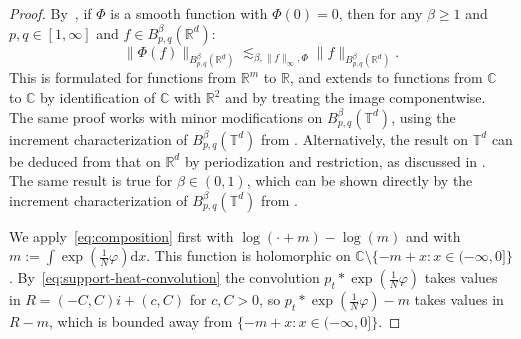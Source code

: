 \documentclass[a4paper,12pt]{article}
\newcommand{\mathd}{\mathrm{d}}
\newcommand{\R}{\mathbb{R}}
\newcommand{\T}{\mathbb{T}}
\newcommand{\C}{\mathbb{C}}
\begin{document}
\begin{proof}
    By~\cite[Chapter 5.5, Theorem~2]{Runst1996}, if $\Phi$ is a smooth function with $\Phi(0) = 0$, then for any $\beta \geq 1$ and $p,q \in [1,\infty]$ and $f \in B^\beta_{p,q}(\R^d)$:
    \begin{equation}\label{eq:composition}
        \|\Phi(f)\|_{B^\beta_{p,q}(\R^d)} \lesssim_{\beta,\|f\|_\infty,\Phi} \|f\|_{B^\beta_{p,q}(\R^d)}.
    \end{equation}
    This is formulated for functions from $\R^m$ to $\R$, and extends to functions from $\C$ to $\C$ by identification of $\C$ with $\R^2$ and by treating the image componentwise. The same proof works with minor modifications on $B^\beta_{p,q}(\T^d)$, using the increment characterization of $B^\beta_{p,q}(\T^d)$ from \cite[Chapter 3.5.4]{Schmeisser1987}. Alternatively, the result on $\T^d$ can be deduced from that on $\R^d$ by periodization and restriction, as discussed in \cite[Section 5]{Ehrnstrom2018}. The same result is true for $\beta \in (0,1)$, which can be shown directly by the increment characterization of $B^\beta_{p,q}(\T^d)$ from \cite[Chapter 3.5.4]{Schmeisser1987}.
    
    We apply~\eqref{eq:composition} first with $\log(\cdot + m) - \log( m)$ %
    and with $m:=\int \exp(\tfrac1N \varphi) \mathd x$. This function is holomorphic on $\C\setminus\{-m+x: x \in (-\infty, 0]\}$.  By~\eqref{eq:support-heat-convolution} the convolution $p_t \ast \exp(\tfrac1N \varphi)$ takes values  in $R =  (- C, C) i + (c, C)$ for $c,C>0$, so $p_t \ast \exp(\tfrac1N \varphi) - m$ takes values in $R-m$, which is bounded away from $\{-m+x: x \in (-\infty, 0]\}$. 


\end{proof}
\end{document}
